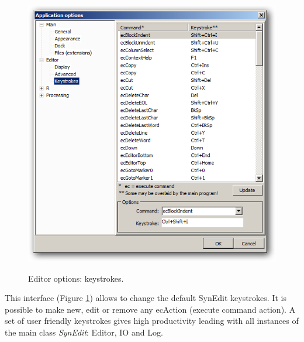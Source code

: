 \begin{figure}[h!]
  \includegraphics[scale=0.50]{./res/app_editor_keystrokes.png}\\
  \caption{Editor options: keystrokes.}
  \label{fig:editor_keystrokes}
\end{figure}

This interface
(Figure \ref{fig:editor_keystrokes})
allows to change the default SynEdit keystrokes.
It is possible to make new, edit or remove any ecAction (execute command action).
A set of user friendly keystrokes gives high productivity leading with
all instances of the main class \textit{SynEdit}: Editor, IO and Log.
